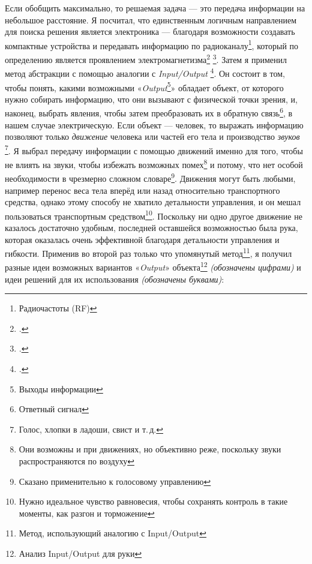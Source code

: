 \documentclass[a4paper, 10pt, final]{article} %
\begin{document}
    Если обобщить максимально, то решаемая задача --- это передача информации на небольшое расстояние.
    Я посчитал, что единственным логичным направлением для поиска решения является электроника --- благодаря возможности создавать компактные устройства и передавать информацию по радиоканалу\footnote{Радиочастоты (RF)}, который по определению является проявлением электромагнетизма\footcite[«Поле» (электромагнитное) «можно рассматривать как сочетание электрического и магнитного полей»]{Electromagnetism:Wiki} \footcite[«Электричество связано с магнетизмом, поскольку оба являются частью явления электромагнетизма»]{Electricity:Wiki}.
    Затем я применил метод абстракции с помощью аналогии с \emph{Input/Output} \footcite[]{IO:Wiki}.
    Он состоит в том, чтобы понять, какими возможными «\emph{Output}\footnote{Выходы информации}» обладает объект, от которого нужно собирать информацию, что они вызывают с физической точки зрения, и, наконец, выбрать явления, чтобы затем преобразовать их в обратную связь\footnote{Ответный сигнал}, в нашем случае электрическую.
    Если объект --- человек, то выражать информацию позволяют только \emph{движение} человека или частей его тела и производство \emph{звуков} \footnote{Голос, хлопки в ладоши, свист и т.\,д.}.
    Я выбрал передачу информации с помощью движений именно для того, чтобы не влиять на звуки, чтобы избежать возможных помех\footnote{Они возможны и при движениях, но объективно реже, поскольку звуки распространяются по воздуху} и потому, что нет особой необходимости в чрезмерно сложном словаре\footnote{Сказано применительно к голосовому управлению}.
    Движения могут быть любыми, например перенос веса тела вперёд или назад относительно транспортного средства, однако этому способу не хватило детальности управления, и он мешал пользоваться транспортным средством\footnote{Нужно идеальное чувство равновесия, чтобы сохранять контроль в такие моменты, как разгон и торможение}.
    \clearpage  
    \noindent Поскольку ни одно другое движение не казалось достаточно удобным, последней оставшейся возможностью была рука, которая оказалась очень эффективной благодаря детальности управления и гибкости.
    Применив во второй раз только что упомянутый метод\footnote{Метод, использующий аналогию с Input/Output},
    я получил разные идеи возможных вариантов «\emph{Output}» объекта\footnote{Анализ Input/Output для руки} \emph{(обозначены цифрами)} и идеи решений для их использования \emph{(обозначены буквами)}:
\end{document}
